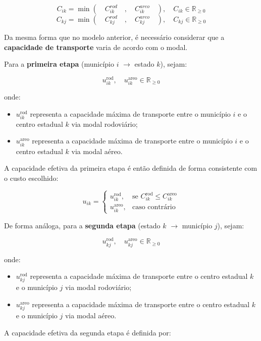 \[
C_{ik} = \min \left( \quad C_{ik}^{rod} \quad , \quad C_{ik}^{areo} \quad \right),  \quad C_{ik} \in \mathbb{R}_{\geq 0}
\]
\[
C_{kj} = \min \left( \quad C_{kj}^{rod} \quad , \quad C_{kj}^{areo} \quad \right),  \quad C_{kj} \in \mathbb{R}_{\geq 0}
\]

Da mesma forma que no modelo anterior, é necessário considerar que a \textbf{capacidade de transporte} varia de acordo com o modal.

Para a \textbf{primeira etapa} (município $i$ $\rightarrow$ estado $k$), sejam:

\[
u_{ik}^{\text{rod}}, \quad u_{ik}^{\text{areo}} \in \mathbb{R}_{\geq 0}
\]

onde:
\begin{itemize}
    \item $u_{ik}^{\text{rod}}$ representa a capacidade máxima de transporte entre o município $i$ e o centro estadual $k$ via modal rodoviário;
    \item $u_{ik}^{\text{areo}}$ representa a capacidade máxima de transporte entre o município $i$ e o centro estadual $k$ via modal aéreo.
\end{itemize}

A capacidade efetiva da primeira etapa é então definida de forma consistente com o custo escolhido:

\begin{equation}
u_{ik} =
\begin{cases}
u_{ik}^{\text{rod}}, & \text{se } C_{ik}^{\text{rod}} \le C_{ik}^{\text{areo}} \\
u_{ik}^{\text{areo}}, & \text{caso contrário}
\end{cases}
\end{equation}

De forma análoga, para a \textbf{segunda etapa} (estado $k$ $\rightarrow$ município $j$), sejam:

\[
u_{kj}^{\text{rod}}, \quad u_{kj}^{\text{areo}} \in \mathbb{R}_{\geq 0}
\]

onde:
\begin{itemize}
    \item $u_{kj}^{\text{rod}}$ representa a capacidade máxima de transporte entre o centro estadual $k$ e o município $j$ via modal rodoviário;
    \item $u_{kj}^{\text{areo}}$ representa a capacidade máxima de transporte entre o centro estadual $k$ e o município $j$ via modal aéreo.
\end{itemize}

A capacidade efetiva da segunda etapa é definida por:

